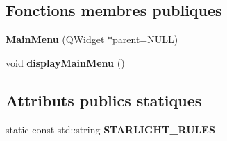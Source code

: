 \subsection*{Fonctions membres publiques}
\begin{DoxyCompactItemize}
\item 
\hypertarget{classMainMenu_a15507d68640fd9651dae4a6e3cf9b870}{{\bfseries Main\+Menu} (Q\+Widget $\ast$parent=N\+U\+L\+L)}\label{classMainMenu_a15507d68640fd9651dae4a6e3cf9b870}

\item 
\hypertarget{classMainMenu_a4b83847fe6109626f6dd4404c8afe4b2}{void {\bfseries display\+Main\+Menu} ()}\label{classMainMenu_a4b83847fe6109626f6dd4404c8afe4b2}

\end{DoxyCompactItemize}
\subsection*{Attributs publics statiques}
\begin{DoxyCompactItemize}
\item 
static const std\+::string {\bfseries S\+T\+A\+R\+L\+I\+G\+H\+T\+\_\+\+R\+U\+L\+E\+S}
\end{DoxyCompactItemize}


